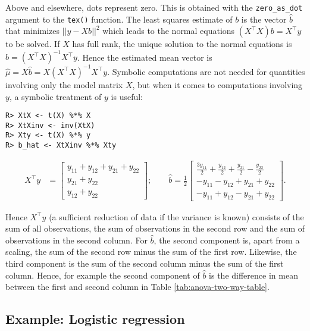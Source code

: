 Above and elsewhere, dots represent zero. This is obtained with the \texttt{zero\_as\_dot} argument to the \texttt{tex()} function.
The least squares estimate of \(b\) is the vector \(\hat{b}\) that minimizes \(||y-X b||^2\) which leads to the normal equations \((X^\top X)b = X^\top y\) to be solved. If \(X\) has full rank, the unique solution to the normal
equations is \(\hat{b} = (X^\top X)^{-1} X^\top y\). Hence the
estimated mean vector is \(\hat \mu = X\hat{b}=X(X^\top X)^{-1} X^\top y\). Symbolic computations are
not needed for quantities involving only the model matrix \(X\), but
when it comes to computations involving \(y\), a symbolic treatment of
\(y\) is useful:

\begin{verbatim}
R> XtX <- t(X) %*% X
R> XtXinv <- inv(XtX)
R> Xty <- t(X) %*% y
R> b_hat <- XtXinv %*% Xty
\end{verbatim}

\begin{align}
X^\top y &= \left[\begin{matrix}y_{11} + y_{12} + y_{21} + y_{22}\\y_{21} + y_{22}\\y_{12} + y_{22}\end{matrix}\right]; \quad 
\quad
\hat{b} = \frac{1}{2}  \left[\begin{matrix}\frac{3 y_{11}}{2} + \frac{y_{12}}{2} + \frac{y_{21}}{2} - \frac{y_{22}}{2}\\- y_{11} - y_{12} + y_{21} + y_{22}\\- y_{11} + y_{12} - y_{21} + y_{22}\end{matrix}\right].
\end{align}

Hence \(X^\top y\) (a sufficient reduction of data if the variance is
known) consists of the sum of all observations, the sum of
observations in the second row and the sum of observations in the
second column. For \(\hat{b}\), the second component is, apart from a
scaling, the sum of the second row minus the sum of the first
row. Likewise, the third component is the sum of the second column
minus the sum of the first column. Hence, for example the second
component of \(\hat{b}\) is the difference in mean between the first and
second column in Table \ref{tab:anova-two-way-table}.

\hypertarget{example-logistic-regression}{%
\subsection{Example: Logistic regression}\label{example-logistic-regression}}

